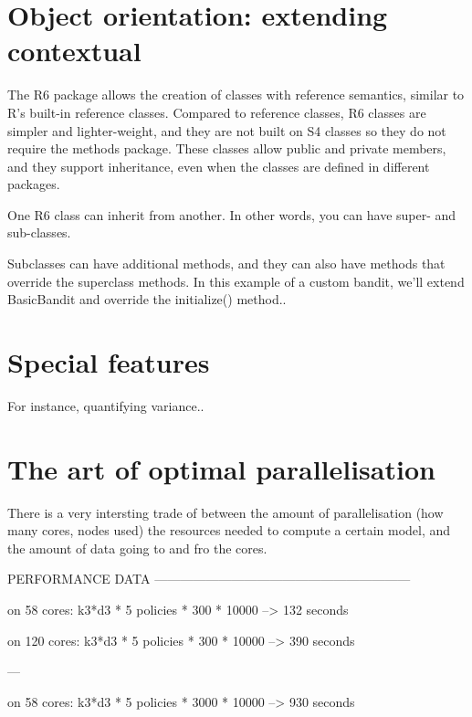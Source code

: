 \documentclass[nojss]{jss}\usepackage[]{graphicx}\usepackage[]{color}
\begin{document}
\section{Object orientation: extending contextual}

The R6 package allows the creation of classes with reference semantics, similar to R's built-in reference classes. Compared to reference classes, R6 classes are simpler and lighter-weight, and they are not built on S4 classes so they do not require the methods package. These classes allow public and private members, and they support inheritance, even when the classes are defined in different packages.

One R6 class can inherit from another. In other words, you can have super- and sub-classes.

Subclasses can have additional methods, and they can also have methods that override the superclass methods. In this example of a custom  bandit, we’ll extend BasicBandit and override the initialize() method..

\section{Special features}

For instance, quantifying variance..

\section{The art of optimal parallelisation}

There is a very intersting trade of between the amount of parallelisation (how many cores, nodes used) the resources needed to compute a certain model, and the amount of data going to and fro the cores.

PERFORMANCE DATA  ------------------------------------------------------------

on 58  cores:    k3*d3 * 5 policies * 300  * 10000 --\textgreater{} 132 seconds

on 120 cores:    k3*d3 * 5 policies * 300  * 10000 --\textgreater{} 390 seconds

---

on 58  cores:    k3*d3 * 5 policies * 3000 * 10000 --\textgreater{} 930 seconds
\end{document}
